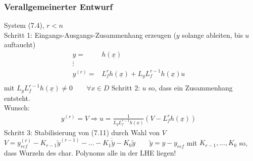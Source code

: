 \documentclass[11pt,a4paper]{article}
\begin{document}
\subsubsection{Verallgemeinerter Entwurf}
System (7.4), $r< n$\\
Schritt 1: Eingangs-Ausgangs-Zusammenhang erzeugen ($y$ solange ableiten, bis $u$ auftaucht)\\
\begin{align*}
y =& h(\underline x)\\
\vdots\\
y^{(r)} =&L_f ^r h(\underline x)  + L_g L_f ^{r-1} h(\underline x) u\\
\end{align*}
mit $L_g L_f ^{r-1} h(\underline x) \ne 0 \qquad \forall x\in D$
Schritt 2: $u$ so, dass ein Zusammenhang entsteht.\\
Wunsch: \begin{align*}y^(r) = V \Rightarrow u = \frac{1}{L_g L_f ^{r-1} h(\underline x)} (V - L_f ^r h(\underline x)) \tag{7.11} \end{align*}
Schritt 3: Stabilisierung von (7.11) durch Wahl von $V$\\
$V = y_{ref} ^{(r)} - K_{r-1} \tilde y ^{(r-1)} - \dots - K_1 \ddot \tilde y - K_0 \tilde y \qquad \tilde y = y- y_{ref}$ mit $K_{r-1},\dots, K_0$ so, dass Wurzeln des char. Polynoms alle in der LHE liegen!\\
\end{document}
